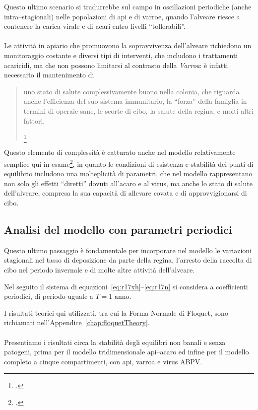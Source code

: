 Questo ultimo scenario si tradurrebbe sul campo in oscillazioni periodiche (anche intra--stagionali) nelle popolazioni
di api e di varroe, quando l'alveare riesce a contenere la carica virale e di acari entro livelli ``tollerabili''.

\paragraph{}
Le attività in apiario che promuovono la sopravvivenza dell'alveare richiedono un monitoraggio costante e diversi tipi di interventi, che includono i trattamenti acaricidi, ma che non possono limitarsi al contrasto della \emph{Varroa}: è infatti necessario il mantenimento di
\blockquote[{\footcite{privFDL}}]{\omissis uno stato di salute complessivamente buono nella colonia, che riguarda anche l'efficienza del suo sistema immunitario, la ``forza'' della famiglia in termini di operaie sane, le scorte di cibo, la salute della regina, e molti altri fattori.}

Questo elemento di complessità è catturato anche nel modello relativamente semplice qui in esame\footcite{ratti2017},
in quanto le condizioni di esistenza e stabilità dei punti di equilibrio includono una molteplicità di parametri,
che nel modello rappresentano non solo gli effetti ``diretti'' dovuti all'acaro e al virus, ma anche
lo stato di salute dell'alveare, compresa la sua capacità di allevare covata e di approvvigionarsi di cibo.


\subsection{Analisi del modello con parametri periodici}
\label{sez:paramPeriodici}
Questo ultimo passaggio è fondamentale per incorporare nel modello le variazioni stagionali nel tasso di deposizione da parte della regina, l'arresto della raccolta di cibo nel periodo invernale e di molte altre attività dell'alveare.

Nel seguito il sistema di equazioni~\eqref{eq:r17xh}--\eqref{eq:r17n} si considera a coefficienti periodici,
di periodo uguale a $T= 1 \text{ anno}$.

I risultati teorici qui utilizzati, tra cui la Forma Normale di Floquet, sono richiamati nell'Appendice~\ref{chap:floquetTheory}.

\paragraph{}
Presentiamo i risultati circa la stabilità degli equilibri non banali e senza patogeni, prima per il modello
tridimensionale api--acaro ed infine per il modello completo a cinque compartimenti, con api, varroa e virus ABPV.

